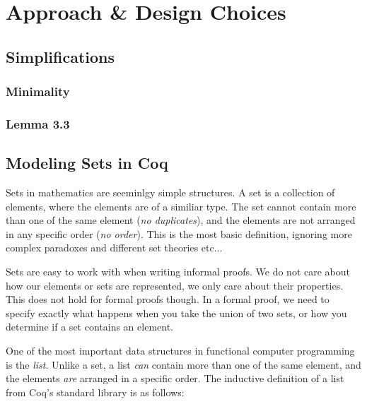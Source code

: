 \chapter{Approach \& Design Choices}


\section{Simplifications}

\subsection{Minimality}

\subsection{Lemma 3.3}

\section{Modeling Sets in Coq}

Sets in mathematics are seeminlgy simple structures.
A set is a collection of elements, where the elements are of a similiar type.
The set cannot contain more than one of the same element (\textit{no duplicates}), and the elements are not arranged in any
specific order (\textit{no order}). This is the most basic definition, ignoring more complex paradoxes and different set theories etc...

Sets are easy to work with when writing informal proofs.
We do not care about how our elements or sets are represented, we only care about their properties.
This does not hold for formal proofs though. In a formal proof, we need to specify exactly what happens
when you take the union of two sets, or how you determine if a set contains an element.

One of the most important data structures in functional computer programming is the \textit{list}.
Unlike a set, a list \textit{can} contain more than one of the same element, and the elements \textit{are} arranged in a
specific order.
The inductive definition of a list from Coq's standard library is as follows:

